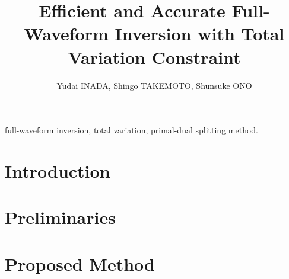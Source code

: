 \documentclass[journal]{IEEEtran}
\begin{document}
    

    \title{Efficient and Accurate Full-Waveform Inversion with Total Variation Constraint}

	\author{
        Yudai INADA, Shingo TAKEMOTO, Shunsuke ONO





		
	}



    \maketitle

    \begin{abstract}  \end{abstract}

    \begin{IEEEkeywords} full-waveform inversion, total variation, primal-dual splitting method. \end{IEEEkeywords}

    \IEEEpeerreviewmaketitle

    \section{Introduction}      \label{sec:Introduction}    

    \section{Preliminaries}     \label{sec:Preliminaries}   

    \section{Proposed Method}   \label{sec:ProposedMethod}  
\end{document}
